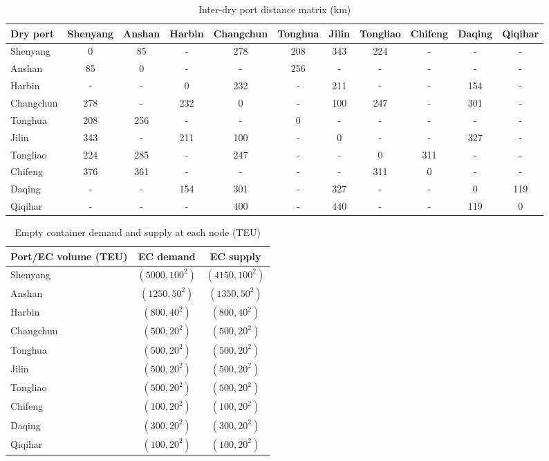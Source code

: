 \documentclass[preprint,12pt]{elsarticle}
\begin{document}
\begin{table}
\centering
\caption{Inter-dry port distance matrix (km)}
\label{tab:inter_dryport_distance}
\small
\setlength{\tabcolsep}{4pt}
\begin{tabular}{l*{10}{c}}
\hline
Dry port & Shenyang & Anshan & Harbin & Changchun & Tonghua & Jilin & Tongliao & Chifeng & Daqing & Qiqihar \\
\hline
Shenyang & 0 & 85 & - & 278 & 208 & 343 & 224 & - & - & - \\
Anshan & 85 & 0 & - & - & 256 & - & - & - & - & - \\
Harbin & - & - & 0 & 232 & - & 211 & - & - & 154 & - \\
Changchun & 278 & - & 232 & 0 & - & 100 & 247 & - & 301 & - \\
Tonghua & 208 & 256 & - & - & 0 & - & - & - & - & - \\
Jilin & 343 & - & 211 & 100 & - & 0 & - & - & 327 & - \\
Tongliao & 224 & 285 & - & 247 & - & - & 0 & 311 & - & - \\
Chifeng & 376 & 361 & - & - & - & - & 311 & 0 & - & - \\
Daqing & - & - & 154 & 301 & - & 327 & - & - & 0 & 119 \\
Qiqihar & - & - & - & 400 & - & 440 & - & - & 119 & 0 \\
\hline
\end{tabular}
\end{table}

\begin{table}[htbp]
\centering
\caption{Empty container demand and supply at each node (TEU)}
\label{tab:ec_demand_supply}
\begin{tabular}{lcc}
\hline
Port/EC volume (TEU) & EC demand & EC supply \\
\hline
Shenyang & $(5000, 100^2)$ & $(4150, 100^2)$ \\
Anshan & $(1250, 50^2)$ & $(1350, 50^2)$ \\
Harbin & $(800, 40^2)$ & $(800, 40^2)$ \\
Changchun & $(500, 20^2)$ & $(500, 20^2)$ \\
Tonghua & $(500, 20^2)$ & $(500, 20^2)$ \\
Jilin & $(500, 20^2)$ & $(500, 20^2)$ \\
Tongliao & $(500, 20^2)$ & $(500, 20^2)$ \\
Chifeng & $(100, 20^2)$ & $(100, 20^2)$ \\
Daqing & $(300, 20^2)$ & $(300, 20^2)$ \\
Qiqihar & $(100, 20^2)$ & $(100, 20^2)$ \\
\hline
\end{tabular}
\end{table}
\clearpage
\end{document}
